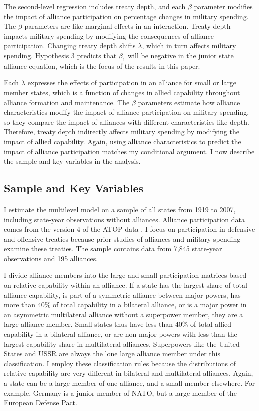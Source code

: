 \documentclass[12pt]{article}
\begin{document}
The second-level regression includes treaty depth, and each $\beta$ parameter modifies the impact of alliance participation on percentage changes in military spending. 
The $\beta$ parameters are like marginal effects in an interaction. 
Treaty depth impacts military spending by modifying the consequences of alliance participation. 
Changing treaty depth shifts $\lambda$, which in turn affects military spending.
Hypothesis 3 predicts that $\beta_1$ will be negative in the junior state alliance equation, which is the focus of the results in this paper. 


Each $\lambda$ expresses the effects of participation in an alliance for small or large member states, which is a function of changes in allied capability throughout alliance formation and maintenance.
The $\beta$ parameters estimate how alliance characteristics modify the impact of alliance participation on military spending, so they compare the impact of alliances with different characteristics like depth.
Therefore, treaty depth indirectly affects military spending by modifying the impact of allied capability.  
Again, using alliance characteristics to predict the impact of alliance participation matches my conditional argument. 
I now describe the sample and key variables in the analysis.  



\subsection{Sample and Key Variables} 

I estimate the multilevel model on a sample of all states from 1919 to 2007, including state-year observations without alliances. 
Alliance participation data comes from the version 4 of the ATOP data \citep{Leedsetal2002}.  
I focus on participation in defensive and offensive treaties because prior studies of alliances and military spending examine these treaties. 
The sample contains data from 7,845 state-year observations and 195 alliances. 


I divide alliance members into the large and small participation matrices based on relative capability within an alliance. 
If a state has the largest share of total alliance capability, is part of a symmetric alliance between major powers, has more than 40\% of total capability in a bilateral alliance, or is a major power in an asymmetric multilateral alliance without a superpower member, they are a large alliance member. 
Small states thus have less than 40\% of total allied capability in a bilateral alliance, or are non-major powers with less than the largest capability share in multilateral alliances. 
Superpowers like the United States and USSR are always the lone large alliance member under this classification. 
I employ these classification rules because the distributions of relative capability are very different in bilateral and multilateral alliances. 
Again, a state can be a large member of one alliance, and a small member elsewhere. 
For example, Germany is a junior member of NATO, but a large member of the European Defense Pact.
\end{document}
